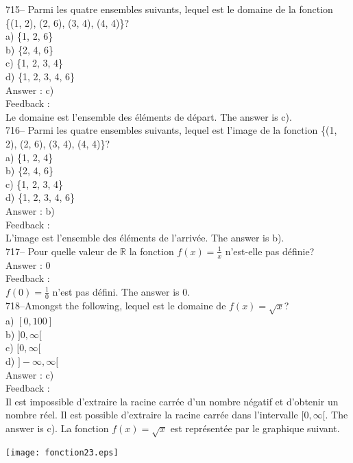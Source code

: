 ﻿\documentclass[letterpaper, 12pt]{article}
\begin{document}
715--  Parmi les quatre ensembles suivants, lequel est le domaine de la
fonction \{(1, 2), (2, 6), (3, 4), (4, 4)\}?\\
a) \{1, 2, 6\}\\
b) \{2, 4, 6\}\\
c) \{1, 2, 3, 4\}\\
d) \{1, 2, 3, 4, 6\}\\

Answer : c)\\

Feedback : \\
Le domaine est l'ensemble des \'el\'ements de d\'epart.  The answer is
c).\\

716--  Parmi les quatre ensembles suivants, lequel est l'image de la
fonction \{(1, 2), (2, 6), (3, 4), (4, 4)\}?\\
a) \{1, 2, 4\}\\
b) \{2, 4, 6\}\\
c) \{1, 2, 3, 4\}\\
d) \{1, 2, 3, 4, 6\}\\

Answer : b)\\

Feedback : \\
L'image est l'ensemble des \'el\'ements de l'arriv\'ee.  The answer is
b).\\

717-- Pour quelle valeur de $\mathbb{R}$ la fonction $f(x)=\frac{1}{x}$
n'est-elle pas d\'efinie?\\

Answer : 0\\

Feedback :\\
$f(0)=\frac{1}{0}$ n'est pas d\'efini.  The answer is 0.\\

718--Amongst the following, lequel est le domaine de
$f(x)=\sqrt{x}$?\\
a) $[0,100]$\\
b) $]0,\infty[$\\
c) $[0,\infty[$\\
d) $]-\infty, \infty[$\\

Answer : c)\\

Feedback : \\
Il est impossible d'extraire la racine carr\'ee d'un nombre n\'egatif et
d'obtenir un nombre r\'eel.  Il est possible d'extraire la racine carr\'ee
dans l'intervalle $[0,\infty[$.  The answer is c).  La fonction
$f(x)=\sqrt{x}$ est repr\'esent\'ee par le graphique suivant.\\
    \begin{center}
    \texttt{[image: fonction23.eps]}
    \end{center}
\end{document}
